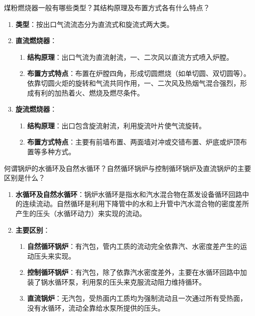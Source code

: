 \begin{problem}
煤粉燃烧器一般有哪些类型？其结构原理及布置方式各有什么特点？
\end{problem}

\begin{solution}
\begin{enumerate}
  \item \textbf{类型}：按出口气流流态分为直流式和旋流式两大类。
  \item \textbf{直流燃烧器}：
  \begin{enumerate}
    \item \textbf{结构原理}：出口气流为直流射流，一、二次风以直流方式喷入炉膛。
    \item \textbf{布置方式特点}：布置在炉膛四角，形成切圆燃烧（如单切圆、双切圆等）。依靠切圆火炬的旋转和气流共同作用，一、二次风及热烟气混合强烈，形成有利的加热着火、燃烧及燃尽条件。
  \end{enumerate}
  \item \textbf{旋流燃烧器}：
  \begin{enumerate}
    \item \textbf{结构原理}：出口包含旋流射流，利用旋流叶片使气流旋转。
    \item \textbf{布置方式特点}：主要有前墙布置、两面墙对冲或交错布置、炉底或炉顶布置等多种方式。
  \end{enumerate}
\end{enumerate}
\end{solution}

\begin{problem}
何谓锅炉的水循环及自然水循环？自然循环锅炉与控制循环锅炉及直流锅炉的主要区别是什么？
\end{problem}

\begin{solution}
\begin{enumerate}
  \item \textbf{水循环及自然水循环}：锅炉水循环是指水和汽水混合物在蒸发设备循环回路中的连续流动。自然循环是利用下降管中的水和上升管中汽水混合物的密度差所产生的压头（水循环动力）来实现的流动。
  \item \textbf{主要区别}：
  \begin{enumerate}
    \item \textbf{自然循环锅炉}：有汽包，管内工质的流动完全依靠汽、水密度差产生的运动压头来实现。
    \item \textbf{控制循环锅炉}：有汽包，除了依靠汽水密度差外，主要在水循环回路中加装了锅水循环泵，利用泵的压头来克服流动阻力维持循环。
    \item \textbf{直流锅炉}：无汽包，受热面内工质均为强制流动且一次通过所有受热面，没有水循环，流动全靠给水泵所提供的压头。
  \end{enumerate}
\end{enumerate}
\end{solution}

